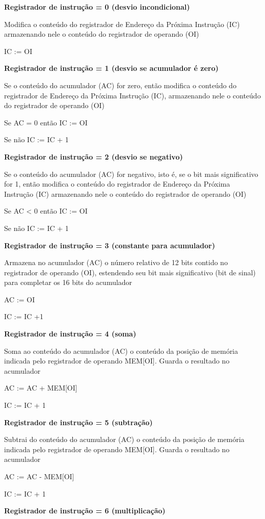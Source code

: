 \textbf{Registrador de instrução = 0 (desvio incondicional)}


Modifica o conteúdo do registrador de Endereço da Próxima Instrução (IC) armazenando nele o conteúdo do registrador de operando (OI)


IC := OI


\textbf{Registrador de instrução = 1 (desvio se acumulador é zero)}


Se o conteúdo do acumulador (AC) for zero, então modifica o conteúdo do registrador de Endereço da Próxima Instrução (IC), armazenando nele o conteúdo do registrador de operando (OI) 


Se AC = 0 então IC := OI 


Se não IC := IC + 1 


\textbf{Registrador de instrução = 2 (desvio se negativo)}


Se o conteúdo do acumulador (AC) for negativo, isto é, se o bit mais significativo for 1, então modifica o conteúdo do registrador de Endereço da Próxima Instrução  (IC) armazenando nele o conteúdo do registrador de operando (OI)


Se AC < 0 então IC := OI 


Se não IC := IC + 1


\textbf{Registrador de instrução = 3 (constante para acumulador)}


Armazena no acumulador (AC) o número relativo de 12 bits contido no registrador de operando (OI), estendendo seu bit mais significativo (bit de sinal) para completar os 16 bits do acumulador
		

AC := OI 


IC := IC +1 


\textbf{Registrador de instrução = 4 (soma)}


Soma ao conteúdo do acumulador (AC) o conteúdo da posição de memória indicada pelo registrador de operando MEM[OI]. Guarda o resultado no acumulador


AC := AC + MEM[OI] 


IC := IC + 1


\textbf{Registrador de instrução = 5 (subtração)}


Subtrai do conteúdo do acumulador (AC) o conteúdo da posição de memória indicada pelo registrador de operando MEM[OI]. Guarda o resultado no acumulador


AC := AC - MEM[OI]


IC := IC + 1 
		

\textbf{Registrador de instrução = 6 (multiplicação)}


